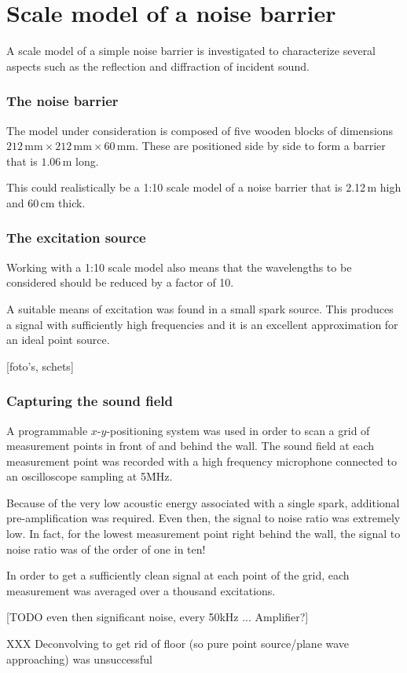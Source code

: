 \section{Scale model of a noise barrier}
A scale model of a simple noise barrier is investigated to characterize several aspects such as the reflection and diffraction of incident sound.

\subsubsection*{The noise barrier}
The model under consideration is composed of five wooden blocks of dimensions $212\,\mathrm{mm} \times 212\,\mathrm{mm} \times 60\,\mathrm{mm}$. These are positioned side by side to form a barrier that is $1.06\,\mathrm{m}$ long.

This could realistically be a 1:10 scale model of a noise barrier that is 2.12\,m high and 60\,cm thick. 

\subsubsection*{The excitation source}
Working with a 1:10 scale model also means that the wavelengths to be considered should be reduced by a factor of 10.

A suitable means of excitation was found in a small spark source. This produces a signal with sufficiently high frequencies and it is an excellent approximation for an ideal point source.

[foto's, schets]

\subsubsection*{Capturing the sound field}
A programmable $x$-$y$-positioning system was used in order to scan a grid of measurement points in front of and behind the wall. The sound field at each measurement point was recorded with a high frequency microphone connected to an oscilloscope sampling at 5\.MHz.

Because of the very low acoustic energy associated with a single spark, additional pre-amplification was required. Even then, the signal to noise ratio was extremely low. In fact, for the lowest measurement point right behind the wall, the signal to noise ratio was of the order of one in ten!

In order to get a sufficiently clean signal at each point of the grid, each measurement was averaged over a thousand excitations.

[TODO even then significant noise, every 50kHz ... Amplifier?]




XXX Deconvolving to get rid of floor (so pure point source/plane wave approaching) was unsuccessful



